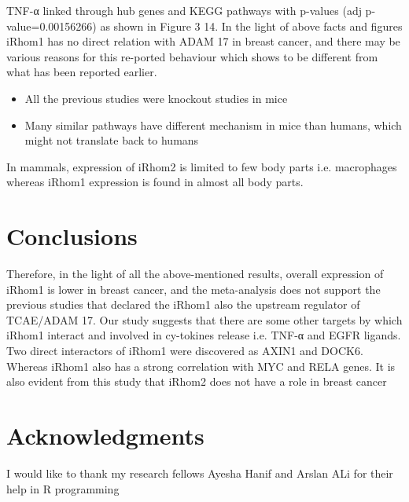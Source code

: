 \documentclass[fleqn,10pt,lineno]{wlpeerj}
\begin{document}
TNF-α linked through hub genes and KEGG pathways with p-values (adj p-value=0.00156266) as shown in Figure 3 14. In the light of above facts and figures iRhom1 has no direct relation with ADAM 17 in breast cancer, and there may be various reasons for this re-ported behaviour which shows to be different from what has been reported earlier. 
\begin{itemize}[noitemsep] 
\item All the previous studies were knockout studies in mice
\item Many similar pathways have different mechanism in mice than humans, which might not translate back to humans
\end{itemize}
In mammals, expression of iRhom2 is limited to few body parts i.e. macrophages whereas iRhom1 expression is found in almost all body parts.


\section*{Conclusions}

Therefore, in the light of all the above-mentioned results, overall expression of iRhom1 is lower in breast cancer, and the meta-analysis does not support the previous studies that declared the iRhom1 also the upstream regulator of TCAE/ADAM 17. Our study suggests that there are some other targets by which iRhom1 interact and involved in cy-tokines release i.e. TNF-α and EGFR ligands. Two direct interactors of iRhom1 were discovered as AXIN1 and DOCK6. Whereas iRhom1 also has a strong correlation with MYC and RELA genes. It is also evident from this study that iRhom2 does not have a role in breast cancer


\section*{Acknowledgments}

I would like to thank my research fellows Ayesha Hanif and Arslan ALi for their help in R programming


\end{document}
